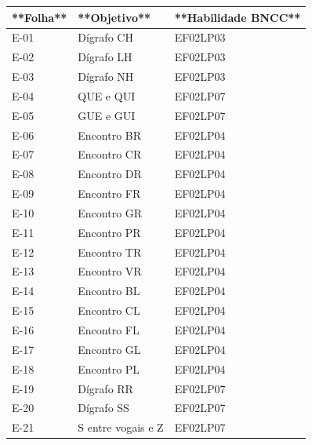 \begin{center}\renewcommand{\arraystretch}{1.5}
\begin{tabular}{lll}
\toprule
**Folha** & **Objetivo** & **Habilidade BNCC** \\
\midrule

E-01 & Dígrafo CH & EF02LP03 \\

E-02 & Dígrafo LH & EF02LP03 \\

E-03 & Dígrafo NH & EF02LP03 \\

E-04 & QUE e QUI & EF02LP07 \\

E-05 & GUE e GUI & EF02LP07 \\

E-06 & Encontro BR & EF02LP04 \\

E-07 & Encontro CR & EF02LP04 \\

E-08 & Encontro DR & EF02LP04 \\

E-09 & Encontro FR & EF02LP04 \\

E-10 & Encontro GR & EF02LP04 \\

E-11 & Encontro PR & EF02LP04 \\

E-12 & Encontro TR & EF02LP04 \\

E-13 & Encontro VR & EF02LP04 \\

E-14 & Encontro BL & EF02LP04 \\

E-15 & Encontro CL & EF02LP04 \\

E-16 & Encontro FL & EF02LP04 \\

E-17 & Encontro GL & EF02LP04 \\

E-18 & Encontro PL & EF02LP04 \\

E-19 & Dígrafo RR & EF02LP07 \\

E-20 & Dígrafo SS & EF02LP07 \\

E-21 & S entre vogais e Z & EF02LP07 \\


\end{tabular}
\end{center}
